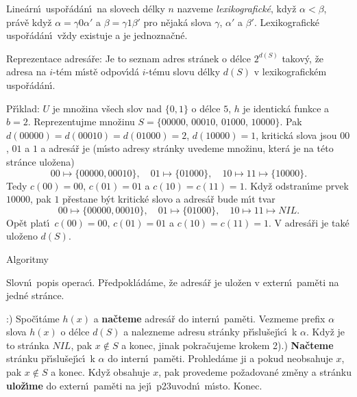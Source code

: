 \flushpar Line\'arn\'\i\ uspo\v r\'ad\'an\'\i\ na slovech d\'elky $
n$ nazveme 
\emph{lexikografick\'e}, kdy\v z $\alpha <\beta$, pr\'av\v e kdy\v z 
$\alpha =\gamma 0\alpha'$ a $\beta =\gamma 1\beta'$ pro n\v ejak\'a slova $
\gamma$, $\alpha'$ a $\beta'$. 
Lexikografick\'e uspo\v r\'ad\'an\'\i\ v\v zdy existuje a je 
jednozna\v cn\'e.
\medskip

\flushpar Reprezentace adres\'a\v re: Je to seznam adres 
str\'anek o d\'elce $2^{d(S)}$ takov\'y, \v ze adresa na $i$-t\'em m\'\i st\v e 
odpov\'\i d\'a $i$-t\'emu slovu d\'elky $d(S)$ v lexikografick\'em 
uspo\v r\'ad\'an\'\i .

\flushpar P\v r\'\i klad: $U$ je mno\v zina v\v sech slov nad $\{
0,1\}$ o 
d\'elce $5$, $h$ 
je identick\'a funkce a $b=2$. Reprezentujme mno\v zinu  
$S=\{00000,\,00010,\,01000,\,10000\}$. Pak 
$d(00000)=d(00010)=d(01000)=2$, $d(10000)=1$, kritick\'a slova 
jsou $00$, $01$ a $1$ a adres\'a\v r je (m\'\i sto adresy str\'anky 
uvedeme mno\v zinu, kter\'a je na t\'eto str\'ance ulo\v zena)
$$00\mapsto \{00000,00010\},\quad 01\mapsto \{01000\},\quad 10\mapsto 
11\mapsto \{10000\}.$$
Tedy $c(00)=00$, $c(01)=01$ a $c(10)=c(11)=1$.
Kdy\v z odstran\'\i me prvek $10000$, pak $1$ p\v restane b\'yt kritick\'e 
slovo a adres\'a\v r bude m\'\i t tvar
$$00\mapsto \{00000,00010\},\quad 01\mapsto \{01000\},\quad 10\mapsto 
11\mapsto NIL.$$
Op\v et plat\'\i\ $c(00)=00$, $c(01)=01$ a $c(10)=c(11)=1$.
V adres\'a\v ri je tak\'e ulo\v zeno $d(S)$.
\medskip

\subhead
Algoritmy
\endsubhead
\smallskip

\flushpar Slovn\'\i\ popis operac\'\i . P\v redpokl\'ad\'ame, \v ze adres\'a\v r 
je ulo\v zen v extern\'\i\ pam\v eti na jedn\'e str\'ance.
\medskip

:) Spo\v c\'\i t\'ame $h(x)$ a {\bf na\v cteme} adres\'a\v r do intern\'\i\ pam\v eti. 
Vez\-me\-me prefix $\alpha$ slova $h(x)$ o d\'elce $d(S)$ a nalezneme 
adresu str\'anky p\v r\'\i slu\v sej\'\i c\'\i\ k $\alpha$. Kdy\v z je to str\'anka 
$NIL$, pak $x\notin S$ a konec, jinak pokra\v cujeme krokem 
2).) {\bf Na\v cteme} str\'anku p\v r\'\i slu\v sej\'\i c\'\i\ k $\alpha$ do intern\'\i\ 
pam\v eti. Prohle\-d\'a\-me ji a pokud neobsahuje $x$, pak $x\notin 
S$ a 
konec. Kdy\v z obsahuje $x$, pak provedeme po\v zadovan\'e 
zm\v eny a str\'anku {\bf ulo\-\v z\'\i\-me} do extern\'\i\ pam\v eti na jej\'\i\ 
p\accent23uvodn\'\i\ m\'\i sto. Konec.
\medskip

